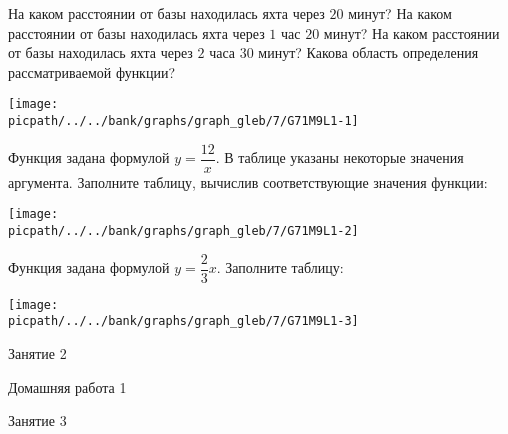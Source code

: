 \begin{class}[number=1]
\begin{listofex}
		\begin{tasks}
			\task На каком расстоянии от базы находилась яхта через \(20\) минут?
			\task На каком расстоянии от базы находилась яхта через \(1\) час \(20\) минут?
			\task На каком расстоянии от базы находилась яхта через \(2\) часа \(30\) минут?
			\task Какова область определения рассматриваемой функции?
		\end{tasks}
		\begin{minipage}[t]{\linewidth}
			\texttt{[image: \\picpath/../../bank/graphs/graph\_gleb/7/G71M9L1-1]}
		\end{minipage}
		\item Функция задана формулой \(y=\dfrac{ 12 }{ x }\). В таблице указаны некоторые значения аргумента. Заполните таблицу, вычислив соответствующие значения функции:
		\begin{minipage}[t]{\linewidth}
			\texttt{[image: \\picpath/../../bank/graphs/graph\_gleb/7/G71M9L1-2]}
		\end{minipage}
		\item Функция задана формулой \(y=\dfrac{ 2}{ 3 }x\). Заполните таблицу:
		\begin{minipage}[t]{\linewidth}
			\texttt{[image: \\picpath/../../bank/graphs/graph\_gleb/7/G71M9L1-3]}
		\end{minipage}
	\end{listofex}
\end{class}

\begin{class}[number=2]
	\begin{listofex}
		\item Занятие 2
	\end{listofex}
\end{class}

\begin{homework}[number=1]
	\begin{listofex}
		\item Домашняя работа 1
	\end{listofex}
\end{homework}

\begin{class}[number=3]
	\begin{listofex}
		\item Занятие 3 
	\end{listofex}
\end{class}

